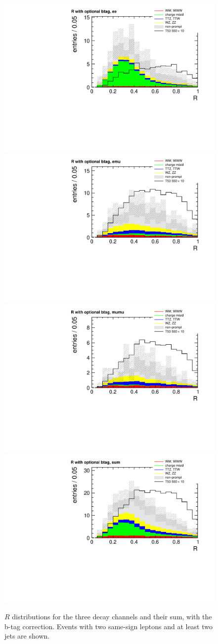 \begin{figure}[htb]
    \centering
    \includegraphics[width=.7\textwidth]{images/pdf/r_optional_btag_ee_0}
    \includegraphics[width=.7\textwidth]{images/pdf/r_optional_btag_emu_0}
    \includegraphics[width=.7\textwidth]{images/pdf/r_optional_btag_mumu_0}
    \includegraphics[width=.7\textwidth]{images/pdf/r_optional_btag_sum_0}
    \caption{$R$ distributions for the three decay channels and their sum,
        with the b-tag correction. Events with two same-sign leptons and at least
two jets are shown.}
    \label{fig:r_optional_btag}
\end{figure}

